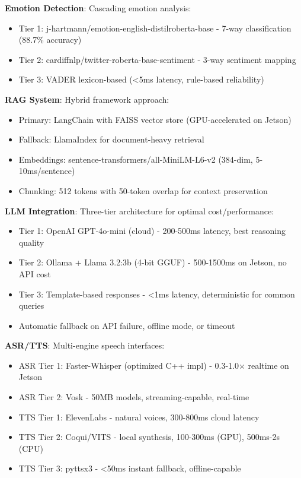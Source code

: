 \documentclass[conference]{IEEEtran}
\begin{document}
\textbf{Emotion Detection}: Cascading emotion analysis:
\begin{itemize}
    \item Tier 1: j-hartmann/emotion-english-distilroberta-base - 7-way classification (88.7\% accuracy)
    \item Tier 2: cardiffnlp/twitter-roberta-base-sentiment - 3-way sentiment mapping
    \item Tier 3: VADER lexicon-based (<5ms latency, rule-based reliability)
\end{itemize}

\textbf{RAG System}: Hybrid framework approach:
\begin{itemize}
    \item Primary: LangChain with FAISS vector store (GPU-accelerated on Jetson)
    \item Fallback: LlamaIndex for document-heavy retrieval
    \item Embeddings: sentence-transformers/all-MiniLM-L6-v2 (384-dim, 5-10ms/sentence)
    \item Chunking: 512 tokens with 50-token overlap for context preservation
\end{itemize}

\textbf{LLM Integration}: Three-tier architecture for optimal cost/performance:
\begin{itemize}
    \item Tier 1: OpenAI GPT-4o-mini (cloud) - 200-500ms latency, best reasoning quality
    \item Tier 2: Ollama + Llama 3.2:3b (4-bit GGUF) - 500-1500ms on Jetson, no API cost
    \item Tier 3: Template-based responses - <1ms latency, deterministic for common queries
    \item Automatic fallback on API failure, offline mode, or timeout
\end{itemize}

\textbf{ASR/TTS}: Multi-engine speech interfaces:
\begin{itemize}
    \item ASR Tier 1: Faster-Whisper (optimized C++ impl) - 0.3-1.0× realtime on Jetson
    \item ASR Tier 2: Vosk - 50MB models, streaming-capable, real-time
    \item TTS Tier 1: ElevenLabs - natural voices, 300-800ms cloud latency
    \item TTS Tier 2: Coqui/VITS - local synthesis, 100-300ms (GPU), 500ms-2s (CPU)
    \item TTS Tier 3: pyttsx3 - <50ms instant fallback, offline-capable
\end{itemize}
\end{document}
